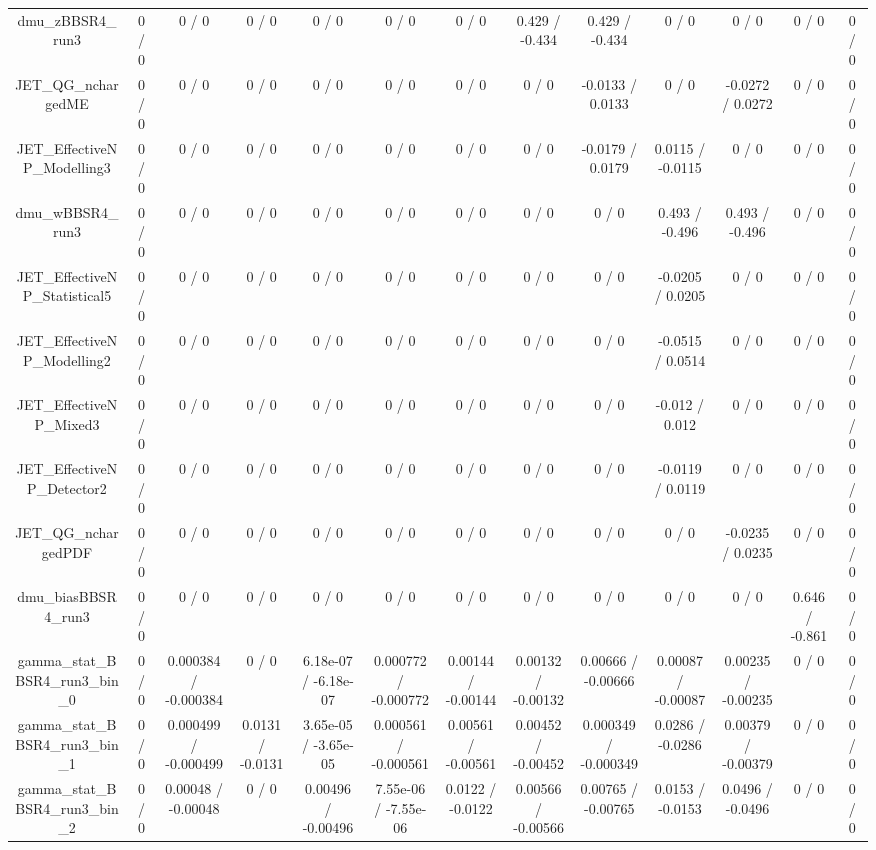\documentclass[10pt]{article}
\begin{document}
\begin{table}[htbp]
\begin{center}
\begin{tabular}{|c|c|c|c|c|c|c|c|c|c|c|c|c|}
  dmu_zBBSR4_run3 & 0 / 0 & 0 / 0 & 0 / 0 & 0 / 0 & 0 / 0 & 0 / 0 & 0.429 / -0.434 & 0.429 / -0.434 & 0 / 0 & 0 / 0 & 0 / 0 & 0 / 0 \\ 
  JET_QG_nchargedME & 0 / 0 & 0 / 0 & 0 / 0 & 0 / 0 & 0 / 0 & 0 / 0 & 0 / 0 & -0.0133 / 0.0133 & 0 / 0 & -0.0272 / 0.0272 & 0 / 0 & 0 / 0 \\ 
  JET_EffectiveNP_Modelling3 & 0 / 0 & 0 / 0 & 0 / 0 & 0 / 0 & 0 / 0 & 0 / 0 & 0 / 0 & -0.0179 / 0.0179 & 0.0115 / -0.0115 & 0 / 0 & 0 / 0 & 0 / 0 \\ 
  dmu_wBBSR4_run3 & 0 / 0 & 0 / 0 & 0 / 0 & 0 / 0 & 0 / 0 & 0 / 0 & 0 / 0 & 0 / 0 & 0.493 / -0.496 & 0.493 / -0.496 & 0 / 0 & 0 / 0 \\ 
  JET_EffectiveNP_Statistical5 & 0 / 0 & 0 / 0 & 0 / 0 & 0 / 0 & 0 / 0 & 0 / 0 & 0 / 0 & 0 / 0 & -0.0205 / 0.0205 & 0 / 0 & 0 / 0 & 0 / 0 \\ 
  JET_EffectiveNP_Modelling2 & 0 / 0 & 0 / 0 & 0 / 0 & 0 / 0 & 0 / 0 & 0 / 0 & 0 / 0 & 0 / 0 & -0.0515 / 0.0514 & 0 / 0 & 0 / 0 & 0 / 0 \\ 
  JET_EffectiveNP_Mixed3 & 0 / 0 & 0 / 0 & 0 / 0 & 0 / 0 & 0 / 0 & 0 / 0 & 0 / 0 & 0 / 0 & -0.012 / 0.012 & 0 / 0 & 0 / 0 & 0 / 0 \\ 
  JET_EffectiveNP_Detector2 & 0 / 0 & 0 / 0 & 0 / 0 & 0 / 0 & 0 / 0 & 0 / 0 & 0 / 0 & 0 / 0 & -0.0119 / 0.0119 & 0 / 0 & 0 / 0 & 0 / 0 \\ 
  JET_QG_nchargedPDF & 0 / 0 & 0 / 0 & 0 / 0 & 0 / 0 & 0 / 0 & 0 / 0 & 0 / 0 & 0 / 0 & 0 / 0 & -0.0235 / 0.0235 & 0 / 0 & 0 / 0 \\ 
  dmu_biasBBSR4_run3 & 0 / 0 & 0 / 0 & 0 / 0 & 0 / 0 & 0 / 0 & 0 / 0 & 0 / 0 & 0 / 0 & 0 / 0 & 0 / 0 & 0.646 / -0.861 & 0 / 0 \\ 
  gamma_stat_BBSR4_run3_bin_0 & 0 / 0 & 0.000384 / -0.000384 & 0 / 0 & 6.18e-07 / -6.18e-07 & 0.000772 / -0.000772 & 0.00144 / -0.00144 & 0.00132 / -0.00132 & 0.00666 / -0.00666 & 0.00087 / -0.00087 & 0.00235 / -0.00235 & 0 / 0 & 0 / 0 \\ 
  gamma_stat_BBSR4_run3_bin_1 & 0 / 0 & 0.000499 / -0.000499 & 0.0131 / -0.0131 & 3.65e-05 / -3.65e-05 & 0.000561 / -0.000561 & 0.00561 / -0.00561 & 0.00452 / -0.00452 & 0.000349 / -0.000349 & 0.0286 / -0.0286 & 0.00379 / -0.00379 & 0 / 0 & 0 / 0 \\ 
  gamma_stat_BBSR4_run3_bin_2 & 0 / 0 & 0.00048 / -0.00048 & 0 / 0 & 0.00496 / -0.00496 & 7.55e-06 / -7.55e-06 & 0.0122 / -0.0122 & 0.00566 / -0.00566 & 0.00765 / -0.00765 & 0.0153 / -0.0153 & 0.0496 / -0.0496 & 0 / 0 & 0 / 0 \\ 

\end{tabular}
\end{center}
\end{table}
\end{document}
